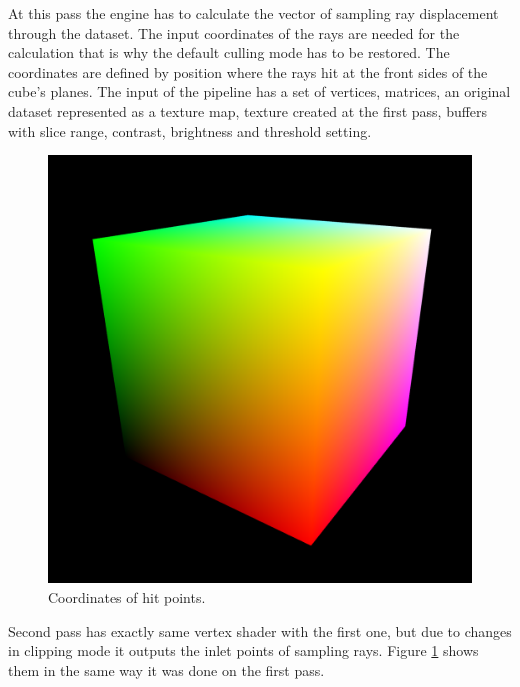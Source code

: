 \documentclass[twoside, english, 11pt]{report}
\begin{document}
At this pass the engine has to calculate the vector of sampling ray displacement through the dataset. The input coordinates of the rays are needed for the calculation that is why the default culling mode has to be restored. The coordinates are defined by position where the rays hit at the front sides of the cube's planes. The input of the pipeline has a set of vertices, matrices, an original dataset represented as a texture map, texture created at the first pass, buffers with slice range, contrast, brightness and threshold setting.\\
\begin{figure}[!h]
\centerline{\includegraphics[scale = 0.3]{img/second}}
\caption{Coordinates of hit points.\label{fig:second}}
\end{figure}

Second pass has exactly same vertex shader with the first one, but due to changes in clipping mode it outputs the inlet points of sampling rays.  Figure \ref{fig:second} shows them in the same way it was done on the first pass.\\
\end{document}

